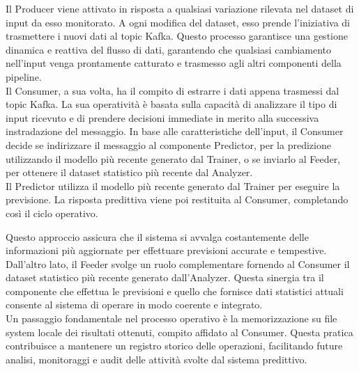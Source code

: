 Il Producer viene attivato in risposta a qualsiasi variazione rilevata nel dataset di input da esso monitorato.
A ogni modifica del dataset, esso prende l'iniziativa di trasmettere i nuovi dati al topic Kafka.
Questo processo garantisce una gestione dinamica e reattiva del flusso di dati, garantendo che qualsiasi cambiamento nell'input venga prontamente catturato e trasmesso agli altri componenti della pipeline. \\
Il Consumer, a sua volta, ha il compito di estrarre i dati appena trasmessi dal topic Kafka.
La sua operatività è basata sulla capacità di analizzare il tipo di input ricevuto e di prendere decisioni immediate in merito alla successiva instradazione del messaggio.
In base alle caratteristiche dell'input, il Consumer decide se indirizzare il messaggio al componente Predictor, per la predizione utilizzando il modello più recente generato dal Trainer, o se inviarlo al Feeder, per ottenere il dataset statistico più recente dal Analyzer. \\
Il Predictor utilizza il modello più recente generato dal Trainer per eseguire la previsione.
La risposta predittiva viene poi restituita al Consumer, completando così il ciclo operativo.

Questo approccio assicura che il sistema si avvalga costantemente delle informazioni più aggiornate per effettuare previsioni accurate e tempestive. \\
Dall'altro lato, il Feeder svolge un ruolo complementare fornendo al Consumer il dataset statistico più recente generato dall'Analyzer.
Questa sinergia tra il componente che effettua le previsioni e quello che fornisce dati statistici attuali consente al sistema di operare in modo coerente e integrato. \\
Un passaggio fondamentale nel processo operativo è la memorizzazione su file system locale dei risultati ottenuti, compito affidato al Consumer.
Questa pratica contribuisce a mantenere un registro storico delle operazioni, facilitando future analisi, monitoraggi e audit delle attività svolte dal sistema predittivo.

